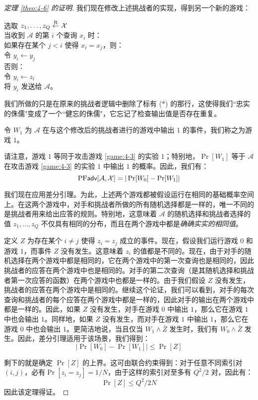 \begin{proof}[定理 \ref{theo:4-6} 的证明]
我们现在修改上述挑战者的实现，得到另一个新的游戏：

\vspace{5pt}

\hspace*{5pt} 选取 $z_1,\dots,z_Q\overset{\rm R}\leftarrow\mathcal{X}$\\
\hspace*{26pt} 当收到 $\mathcal{A}$ 的第 $i$ 个查询 $x_i$ 时：\\
\hspace*{50pt} 如果存在某个 $j<i$ 使得 $x_i=x_j$，则：\\
\hspace*{75pt} 令 $y_i\leftarrow y_j$\\
\hspace*{50pt} 否则：\\
\hspace*{75pt} 令 $y_i\leftarrow z_i$\\
\hspace*{50pt} 将 $y_i$ 发送给 $\mathcal{A}$。

\vspace{5pt}

我们所做的只是在原来的挑战者逻辑中删除了标有 ($*$) 的那行，这使得我们``忠实的侏儒"变成了一个``健忘的侏儒"，它忘记了检查输出值是否存在重复。

令 $W_1$ 为 $\mathcal{A}$ 在与这个修改后的挑战者进行的游戏中输出 $1$ 的事件，我们称之为游戏 $1$。

请注意，游戏 $1$ 等同于攻击游戏 \ref{game:4-3} 的实验 $1$；特别地，$\Pr[W_1]$ 等于 $\mathcal{A}$ 在攻击游戏 \ref{game:4-3} 的实验 $1$ 中输出 $1$ 的概率。因此，我们有：
\[
{\rm PF\mathsf{adv}}[\mathcal{A},\mathcal{X}]=|\Pr[W_0]-\Pr[W_1]|
\]

我们现在应用差分引理。为此，上述两个游戏都被假设运行在相同的基础概率空间上。在这两个游戏中，对手和挑战者所做的所有随机选择都是一样的，唯一不同的是挑战者用来给出应答的规则。特别地，这意味着 $\mathcal{A}$ 的随机选择和挑战者选择的值 $z_1,\dots,z_Q$ 不仅具有相同的分布，而且在两个游戏中都是\emph{确确实实的相同值}。

定义 $Z$ 为存在某个 $i\neq j$ 使得 $z_i=z_j$ 成立的事件。现在，假设我们运行游戏 $0$ 和游戏 $1$，而事件 $Z$ 没有发生。这意味着 $z_i$ 的值都是不同的。现在，由于对手的随机选择在两个游戏中都是相同的，它在两个游戏中的第一次查询也是相同的，因此挑战者的应答在两个游戏中也是相同的。对手的第二次查询（是其随机选择和挑战者第一次应答的函数）在两个游戏中也都是一样的。由于我们假设 $Z$ 没有发生，挑战者的应答在两个游戏中是相同的。继续这个论证，我们可以看到，对手的每次查询和挑战者的每个应答在两个游戏中都是一样的，因此对手的输出在两个游戏中都是一样的。因此，如果 $Z$ 没有发生，对手在游戏 $0$ 中输出 $1$，那么它在游戏 $1$ 中也会输出 $1$。同样地，如果 $Z$ 没有发生，而对手在游戏 $1$ 中输出 $1$，那么它在游戏 $0$ 中也会输出 $1$。更简洁地说，当且仅当 $W_1\land\bar{Z}$ 发生时，我们有 $W_0\land\bar{Z}$ 发生。因此，差分引理适用于该场景，我们得到：
\[
|\Pr[W_0]-\Pr[W_1]|\leq\Pr[Z]
\]

剩下的就是确定 $\Pr[Z]$ 的上界。这可由联合约束得到：对于任意不同索引对 $(i,j)$，必有$\Pr[z_i=z_j]={1}/{N}$，由于这样的索引对至多有 ${Q^2}/{2}$ 对，因此有：
\[
\Pr[Z]\leq{Q^2}/{2N}
\]
因此该定理得证。
\end{proof}

